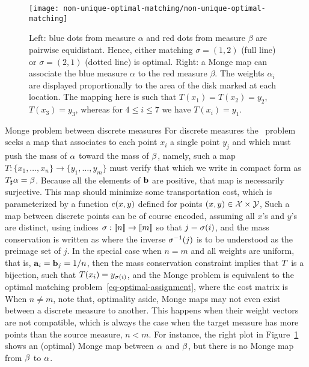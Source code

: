 \begin{figure}[h!]
\centering
\texttt{[image: non-unique-optimal-matching/non-unique-optimal-matching]}
\caption{\label{fig-non-unique-matching}
Left: blue dots from measure $\alpha$ and red dots from measure $\beta$ are pairwise equidistant. Hence, either matching $\sigma=(1,2)$ (full line) or $\sigma=(2,1)$ (dotted line) is optimal. Right: a Monge map can associate the blue measure $\alpha$ to the red measure $\beta$. The weights $\alpha_i$ are displayed proportionally to the area of the disk marked at each location. The mapping here is such that $T(x_1)=T(x_2)=y_2$, $T(x_3)=y_3$, whereas for $4\leq i\leq 7$ we have $T(x_i)=y_1$.
}
\end{figure}


\begin{rem1}{Monge problem between discrete measures}\label{rem-monge1}
For dis\-cre\-te measures
the~\citeauthor{Monge1781} problem~\citeyearpar{Monge1781} seeks a map that associates to each point $x_i$ a single point $y_j$ and which must push the mass of $\alpha$ toward the mass of $\beta$, namely, such a map $T:\{x_1,\dots, x_n\}\rightarrow \{y_1,\dots,y_m\}$ must verify that
which we write in compact form  as $T_\sharp \alpha = \beta$. Because all the elements of $\mathrm{\textbf{b}}$ are positive, that map is necessarily surjective.
%
This map should minimize some transportation cost, which is parameterized by a function $c(x,y)$ defined for points $(x,y) \in \mathcal{X} \times \mathcal{Y}$,
Such a map between discrete points can be of course encoded, assuming all $x$'s and $y$'s are distinct, using indices $\sigma : \llbracket n\rrbracket \rightarrow \llbracket m\rrbracket$ so that $j=\sigma(i)$, and the mass conservation is written as
where the inverse $\sigma^{-1}(j)$ is to be understood as the preimage set of $j$. In the special case when $n=m$ and all weights are uniform, that is, $\mathrm{\textbf{a}}_i=\mathrm{\textbf{b}}_j=1/n$, then the mass conservation constraint implies that $T$ is a bijection, such that $T(x_i)=y_{\sigma(i)}$, and the Monge problem is equivalent to the optimal matching problem~\eqref{eq-optimal-assignment}, where the cost matrix is
When $n\ne m$, note that, optimality aside, Monge maps may not even exist between a discrete measure to another. This happens when their weight vectors are not compatible, which is always the case when the target measure has more points than the source measure, $n<m$. For instance, the right plot in Figure~\ref{fig-non-unique-matching} shows an (optimal) Monge map between $\alpha$ and $\beta$, but there is no Monge map from $\beta$ to $\alpha$.
\end{rem1}


